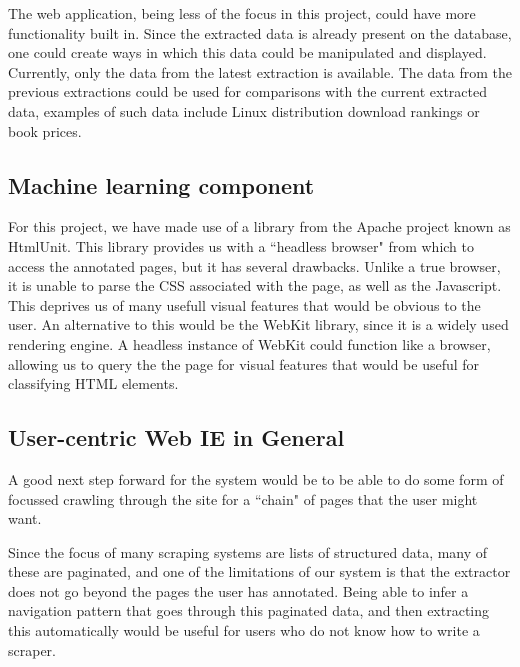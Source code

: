 The web application, being less of the focus in this project, could have more functionality
built in. Since the extracted data is already present on the database, one could create
ways in which this data could be manipulated and displayed. Currently, only the data from
the latest extraction is available. The data from the previous extractions could be used 
for comparisons with the current extracted data, examples of such data include Linux
distribution download rankings or book prices.

\subsection{Machine learning component}
For this project, we have made use of a library from the Apache project known as HtmlUnit.
This library provides us with a ``headless browser" from which to access the annotated pages,
but it has several drawbacks. Unlike a true browser, it is unable to parse the CSS associated
with the page, as well as the Javascript. This deprives us of many usefull visual features
that would be obvious to the user. An alternative to this would be the WebKit library, since
it is a widely used rendering engine. A headless instance of WebKit could function like a
browser, allowing us to query the the page for visual features that would be useful for 
classifying HTML elements.

\subsection{User-centric Web IE in General}
A good next step forward for the system would be to be able to do some form of focussed
crawling through the site for a ``chain" of pages that the user might want.

Since the focus of many scraping systems are lists of structured data, many of these are
paginated, and one of the limitations of our system is that the extractor does not go
beyond the pages the user has annotated. Being able to infer a navigation pattern that
goes through this paginated data, and then extracting this automatically would be useful
for users who do not know how to write a scraper.
